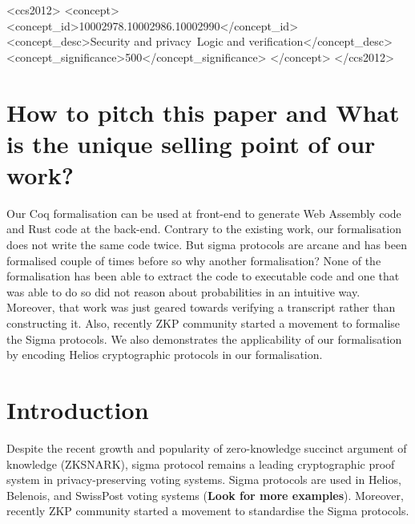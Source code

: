 \documentclass[sigconf]{acmart}
\begin{document}
\begin{CCSXML}
<ccs2012>
  <concept>
      <concept_id>10002978.10002986.10002990</concept_id>
      <concept_desc>Security and privacy~Logic and verification</concept_desc>
      <concept_significance>500</concept_significance>
      </concept>
</ccs2012>
\end{CCSXML}
  




\maketitle

\section{How to pitch this paper and What is the unique selling point of our work?}
Our Coq formalisation can be used at front-end to generate Web Assembly code and 
Rust code at the back-end. Contrary to the existing work, our formalisation
does not write the same code twice. But sigma protocols are arcane and has 
been formalised couple of times before so why another formalisation?
None of the formalisation has been able to extract the code to executable code 
and one that was able to do so did not reason about probabilities in an intuitive way.
Moreover, that work was just geared towards verifying a transcript rather than
constructing it. Also, recently ZKP community started a movement to 
formalise the Sigma protocols. We also demonstrates the 
applicability of our formalisation by encoding Helios cryptographic protocols
in our formalisation. 




\section{Introduction}
Despite the recent growth and popularity of zero-knowledge succinct 
argument of knowledge (ZKSNARK), sigma protocol remains a
leading cryptographic proof system in privacy-preserving voting systems. 
Sigma protocols are used in Helios, Belenois, and SwissPost voting 
systems (\textbf{Look for more examples}). 
Moreover, recently ZKP community started a movement to standardise
the Sigma protocols. 
\end{document}
